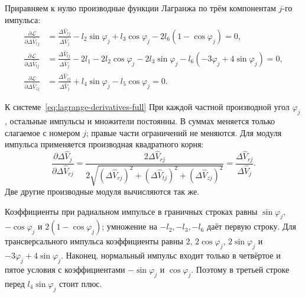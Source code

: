 Приравняем к нулю производные функции Лагранжа по трём компонентам
$j$-го импульса:
\begin{equation}
\begin{aligned}
 \frac{\partial\mathcal L}{\partial\Delta\widehat V_{rj}}
 &=\frac{\Delta\widehat V_{rj}}{\Delta\widehat V_j}
       -l_2\sin\varphi_j+l_3\cos\varphi_j-2l_6(1-\cos\varphi_j)=0,\\[2pt]
 \frac{\partial\mathcal L}{\partial\Delta\widehat V_{tj}}
 &=\frac{\Delta\widehat V_{tj}}{\Delta\widehat V_j}
       -2l_1-2l_2\cos\varphi_j-2l_3\sin\varphi_j
       -l_6(-3\varphi_j+4\sin\varphi_j)=0,\\[2pt]
 \frac{\partial\mathcal L}{\partial\Delta\widehat V_{zj}}
 &=\frac{\Delta\widehat V_{zj}}{\Delta\widehat V_j}
       +l_4\sin\varphi_j-l_5\cos\varphi_j=0.
\end{aligned}
\label{eq:lagrange-derivatives-full}
\end{equation}
\begin{explanation}{К системе~\eqref{eq:lagrange-derivatives-full}}
При каждой частной производной угол $\varphi_j$, остальные
импульсы и множители постоянны. В суммах меняется только
слагаемое с номером $j$; правые части ограничений не меняются.
Для модуля импульса применяется производная квадратного корня:
\[
 \frac{\partial\Delta\widehat V_j}{\partial\Delta\widehat V_{rj}}
 =\frac{2\Delta\widehat V_{rj}}
        {2\sqrt{(\Delta\widehat V_{rj})^2+(\Delta\widehat V_{tj})^2+
                                      (\Delta\widehat V_{zj})^2}}
 =\frac{\Delta\widehat V_{rj}}{\Delta\widehat V_j}.
\]
Две другие производные модуля вычисляются так же.

Коэффициенты при радиальном импульсе в граничных строках равны
$\sin\varphi_j$, $-\cos\varphi_j$ и $2(1-\cos\varphi_j)$;
умножение на $-l_2,-l_3,-l_6$ даёт первую строку.
Для трансверсального импульса коэффициенты равны $2$,
$2\cos\varphi_j$, $2\sin\varphi_j$ и
$-3\varphi_j+4\sin\varphi_j$.
Наконец, нормальный импульс входит только в четвёртое и пятое
условия с коэффициентами $-\sin\varphi_j$ и $\cos\varphi_j$.
Поэтому в третьей строке перед $l_4\sin\varphi_j$ стоит плюс.
\end{explanation}

